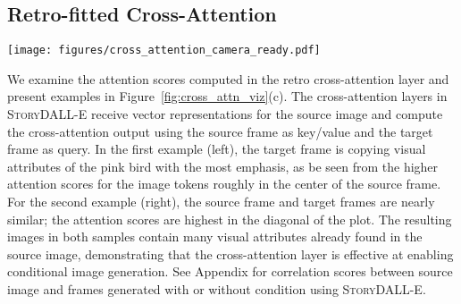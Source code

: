 \documentclass[runningheads]{llncs}
\newcommand{\sdalle}[1]{\textsc{StoryDALL-E}}
\begin{document}
\subsection{Retro-fitted Cross-Attention}
\begin{figure*}[t]
    \centering
    \texttt{[image: figures/cross\_attention\_camera\_ready.pdf]}
            \caption{Examples of generation from \sdalle{} in (a) low-resource scenarios and (b) of unseen characters. (c) Plots of attention scores computed in retro cross-attention layers for examples of source frames (x-axis) and target frames (y-axis).
    \label{fig:cross_attn_viz}}
\end{figure*}

We examine the attention scores computed in the retro cross-attention layer and present examples in Figure~\ref{fig:cross_attn_viz}(c). The cross-attention layers in \sdalle{} receive vector representations for the source image and compute the cross-attention output using the source frame as key/value and the target frame as query. In the first example (left), the target frame is copying visual attributes of the pink bird with the most emphasis, as be seen from the higher attention scores for the image tokens roughly in the center of the source frame. For the second example (right), the source frame and target frames are nearly similar; the attention scores are highest in the diagonal of the plot. The resulting images in both samples contain many visual attributes already found in the source image, demonstrating that the cross-attention layer is effective at enabling conditional image generation. See Appendix for correlation scores between source image and frames generated with or without condition using \sdalle{}.
\end{document}
